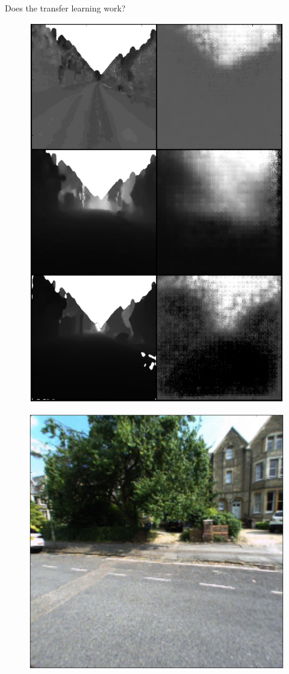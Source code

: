 \begin{frame}{Does the transfer learning work?}
\begin{minipage}[c]{0.24\linewidth}
\begin{figure}[c]
			\includegraphics[width=\linewidth]{images/mod2.png}			
		\end{figure}
	\end{minipage}
	\hfill
	\begin{minipage}[c]{0.24\linewidth}
		\begin{figure}[c]
			\includegraphics[width=0.5\linewidth]{images/rgb3.png}
		

\end{figure}
\end{minipage}
\end{frame}
